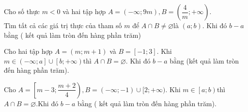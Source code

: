 \begin{ex}%
	Cho số thực ${m<0}$ và hai tập hợp ${A=(-\infty ; 9 m), B=\left(\dfrac{4}{m} ;+\infty\right)}$.\\
	Tìm tất cả các giá trị thực của tham số ${m}$ để ${A \cap B \neq \varnothing}$là $\left( a;b \right)$. Khi đó $b-a$ bằng ( kết quả làm tròn đến hàng phần trăm)
\end{ex}
\begin{ex}%
	Cho hai tập hợp ${A=(m ; m+1)}$ và ${B=[-1 ; 3]}$. Khi $m\in \left( -\infty ;a \right]\cup \left[ b;+\infty \right)$thì ${A \cap B=\varnothing}$. Khi đó $b-a$ bằng (kết quả làm tròn đến hàng phần trăm).
	\loigiai{
		${A \cap B=\varnothing \Leftrightarrow\left[\begin{array}{l}m+1 \leq-1 \\ m \geq 3\end{array} \Leftrightarrow\left[\begin{array}{l}m \leq-2 \\ m \geq 3\end{array}\right.\right.}$.}
\end{ex}
\begin{ex}%
	Cho ${A=\left[m-3 ; \dfrac{m+2}{4}\right), B=(-\infty ;-1) \cup[2 ;+\infty)}$. Khi $m\in \left[ a;b \right)$thì ${A \cap B=\varnothing}$.Khi đó $b-a$ bằng ( kết quả làm tròn đến hàng phần trăm).
\end{ex}

